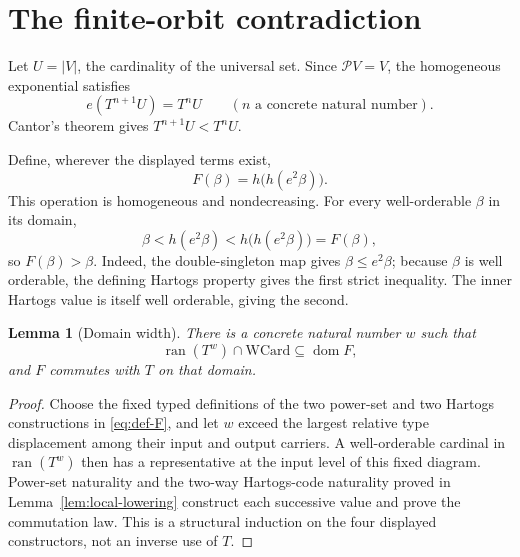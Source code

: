 \documentclass[11pt]{article}
\newtheorem{lemma}[theorem]{Lemma}
\numberwithin{equation}{section}
\theoremstyle{definition}
\theoremstyle{remark}
\newcommand{\Pow}{\mathcal P}
\begin{document}
\section{The finite-orbit contradiction}

Let $U=|V|$, the cardinality of the universal set.  Since
\(\Pow V=V\), the homogeneous exponential satisfies
\begin{equation}
 e(T^{n+1}U)=T^nU
 \qquad(n\text{ a concrete natural number}).
 \label{eq:universal-chain}
\end{equation}
Cantor's theorem gives $T^{n+1}U<T^nU$.

Define, wherever the displayed terms exist,
\begin{equation}
 F(\beta)=h\bigl(h(e^2\beta)\bigr).
 \label{eq:def-F}
\end{equation}
This operation is homogeneous and nondecreasing.  For every well-orderable
\(\beta\) in its domain,
\begin{equation}
 \beta<h(e^2\beta)<h\bigl(h(e^2\beta)\bigr)=F(\beta),
 \label{eq:F-strict}
\end{equation}
so $F(\beta)>\beta$.  Indeed, the double-singleton map gives
$\beta\leq e^2\beta$; because $\beta$ is well orderable, the defining
Hartogs property gives the first strict inequality.  The inner Hartogs
value is itself well orderable, giving the second.

\begin{lemma}[Domain width]\label{lem:domain-width}
There is a concrete natural number $w$ such that
\begin{equation}
 \operatorname{ran}(T^w)\cap\mathrm{WCard}
 \subseteq\operatorname{dom}F,
 \label{eq:F-domain-width}
\end{equation}
and $F$ commutes with $T$ on that domain.
\end{lemma}

\begin{proof}
Choose the fixed typed definitions of the two power-set and two Hartogs
constructions in \eqref{eq:def-F}, and let $w$ exceed the largest relative
type displacement among their input and output carriers.  A well-orderable
cardinal in $\operatorname{ran}(T^w)$ then has a representative at the
input level of this fixed diagram.  Power-set naturality and the two-way
Hartogs-code naturality proved in Lemma~\ref{lem:local-lowering} construct
each successive value and prove the commutation law.  This is a structural
induction on the four displayed constructors, not an inverse use of $T$.
\end{proof}
\end{document}
